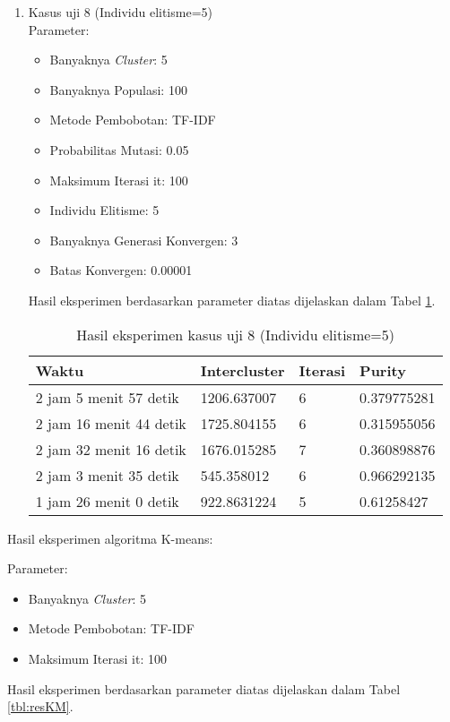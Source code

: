 \begin{enumerate}
	\item Kasus uji 8 (Individu elitisme=5)\\
	Parameter:
	\begin{itemize}
		\item Banyaknya \textit{Cluster}: 5
		\item Banyaknya Populasi: 100
		\item Metode Pembobotan: TF-IDF
		\item Probabilitas Mutasi: 0.05
		\item Maksimum Iterasi it: 100
		\item Individu Elitisme: 5
		\item Banyaknya Generasi Konvergen: 3
		\item Batas Konvergen: 0.00001
	\end{itemize}
	Hasil eksperimen berdasarkan parameter diatas dijelaskan dalam Tabel \ref{tbl:res8}.
	\begin{table}[H]
		\centering
		\caption{Hasil eksperimen kasus uji 8 (Individu elitisme=5)}
		\begin{tabular}{|l|l|l|l|} \hline
			Waktu & Intercluster & Iterasi & Purity \\ \hline
			2 jam 5 menit 57 detik  & 1206.637007 & 6 & 0.379775281 \\ \hline
			2 jam 16 menit 44 detik & 1725.804155 & 6 & 0.315955056 \\ \hline
			2 jam 32 menit 16 detik & 1676.015285 & 7 & 0.360898876 \\ \hline
			2 jam 3 menit 35 detik  & 545.358012  & 6 & 0.966292135 \\ \hline
			1 jam 26 menit 0 detik  & 922.8631224 & 5 & 0.61258427 \\ \hline
		\end{tabular}
		\label{tbl:res8}
	\end{table}
\end{enumerate}

Hasil eksperimen algoritma K-means:

Parameter:
\begin{itemize}
	\item Banyaknya \textit{Cluster}: 5
	\item Metode Pembobotan: TF-IDF
	\item Maksimum Iterasi it: 100
\end{itemize}

Hasil eksperimen berdasarkan parameter diatas dijelaskan dalam Tabel \ref{tbl:resKM}.

